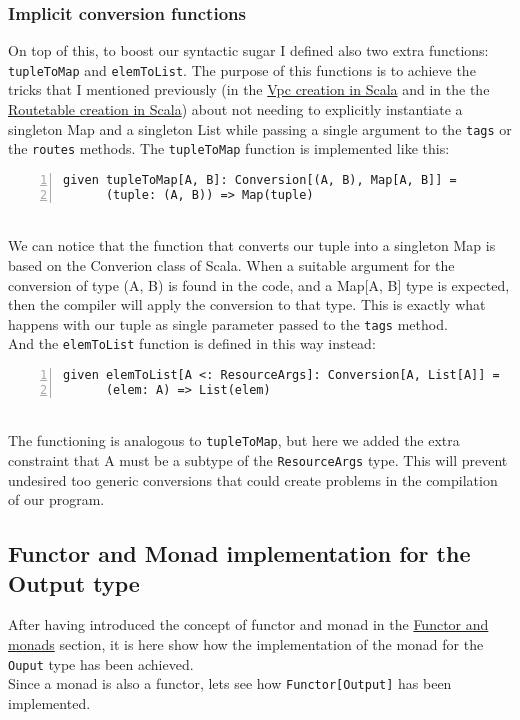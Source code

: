 \subsubsection{Implicit conversion functions}
\label{sssec:implicit-converion-functions}
On top of this, to boost our syntactic sugar I defined also two extra functions: \texttt{tupleToMap} and \texttt{elemToList}.
The purpose of this functions is to achieve the tricks that I mentioned previously (in the \hyperref[sssec:vpc-creation-scala]{Vpc creation in Scala} and in the the \hyperref[sssec:routetable-creation-scala]{Routetable creation in Scala}) about not needing to explicitly instantiate a singleton Map and a singleton List while passing a single argument to the \texttt{tags} or the \texttt{routes} methods.
The \texttt{tupleToMap} function is implemented like this:
\begin{lstlisting}[numbers=left, numberstyle=\tiny, numbersep=-5pt, stepnumber=1, linewidth=420pt]
  given tupleToMap[A, B]: Conversion[(A, B), Map[A, B]] =
	  (tuple: (A, B)) => Map(tuple)
\end{lstlisting}\mbox{}\\
We can notice that the function that converts our tuple into a singleton Map is based on the Converion class of Scala.
When a suitable argument for the conversion of type (A, B) is found in the code, and a Map[A, B] type is expected, then the compiler will apply the conversion to that type.
This is exactly what happens with our tuple as single parameter passed to the \texttt{tags} method.\\
And the \texttt{elemToList} function is defined in this way instead:
\begin{lstlisting}[numbers=left, numberstyle=\tiny, numbersep=-5pt, stepnumber=1, linewidth=420pt]
  given elemToList[A <: ResourceArgs]: Conversion[A, List[A]] =
	  (elem: A) => List(elem)
\end{lstlisting}\mbox{}\\
The functioning is analogous to \texttt{tupleToMap}, but here we added the extra constraint that A must be a subtype of the \texttt{ResourceArgs} type.
This will prevent undesired too generic conversions that could create problems in the compilation of our program.

\subsection{Functor and Monad implementation for the Output type}
After having introduced the concept of functor and monad in the \hyperref[sssec:functors-monads]{Functor and monads} section, it is here show how the implementation of the monad for the \texttt{Ouput} type has been achieved.\\
Since a monad is also a functor, lets see how \texttt{Functor[Output]} has been implemented.

